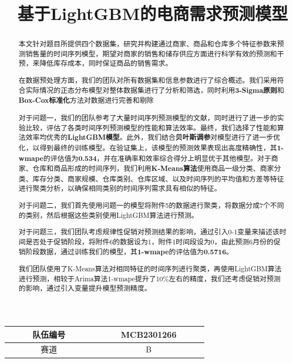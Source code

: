 \documentclass[withoutpreface,bwprint]{cumcmthesis}
\title{基于LightGBM的电商需求预测模型}
\begin{document}
\begin{table}[]
  \centering %
  \begin{tabular}{|c|c|c|c|} %
    \hline %
    \multicolumn{2}{|c|}{~~~~~队伍编号~~~~~} & \multicolumn{2}{|c|}{~~~~~MCB2301266~~~~~} \\
    \hline %
    \multicolumn{2}{|c|}{赛道}   & \multicolumn{2}{|c|}{B} \\
    \hline %
  \end{tabular}
\end{table}


   \maketitle
   \thispagestyle{empty}
\begin{abstract}
\begin{spacing}{1.5}
     本文针对题目所提供四个数据集，研究并构建通过商家、商品和仓库多个特征参数来预测销售量的时间序列模型，期望对商家的销售和储存供应方面进行科学有效的预测和干预，来降低库存成本，同时保证商品的销售需求。

       在数据预处理方面，我们的团队对所有数据集和信息参数进行了综合概述。我们采用符合实际情况的正态分布模型对整体数据集进行了分析和筛选，同时利用\textbf{3-Sigma原则}和\textbf{Box-Cox标准化}方法对数据进行完善和剔除
     
     对于问题一，我们的团队参考了大量时间序列预测模型的文献，同时进行了进一步的实验比较，评估了各类时间序列预测模型的性能和算法效率。最终，我们选择了性能和算法效率均优秀的\textbf{LightGBM模型}。此外，我们结合\textbf{贝叶斯调参}对模型进行了进一步优化，以得到最终的训练模型。在验证集上，该模型的预测效果表现出高度精确性，其\textbf{1-wmape}的评估值为\textbf{0.534}，并在准确率和效率综合得分上明显优于其他模型。对于商家、仓库和商品形成的时间序列，我们利用\textbf{K-Means算法}使用商品一级分类、商家分类、库存分类、商家规模、仓库类别、仓库区域、以及时间序列的平均值和方差等特征进行聚类分析，以确保相同类别的时间序列需求具有相似的特征。
     
     对于问题二，我们首先使用问题一的模型将附件5的数据进行聚类，将数据分成7个不同的类别，然后根据这些类别使用LightGBM算法进行预测。
     
     对于问题三，我们团队考虑规律性促销对预测结果的影响，通过引入0-1变量来描述该时间是否处于促销阶段，将附件6的数据设为1，附件1时间段设为0，由此预测6月份的促销阶段数据，通过训练我们的模型，其\textbf{1-wmape}的评估值为\textbf{0.5716}。

     我们团队使用了K-Means算法对相同特征的时间序列进行聚类，再使用LightGBM算法进行预测，相较于Arima算法1-wmape提升了10\%左右的精度，我们还考虑促销对预测的影响，通过引入变量提升模型预测精度。
     

\end{spacing}
\end{abstract}
\end{document}
